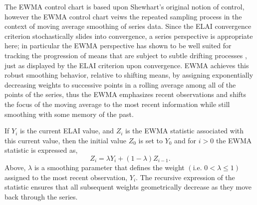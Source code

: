 \documentclass[12pt]{article}
\begin{document}
%
The EWMA control chart is based upon Shewhart's original notion of control, however the EWMA control chart veiws the repeated sampling process in the context of moving average smoothing of series data. %
Since the ELAI convergence criterion stochastically slides into convergence, a series perspective is appropriate here; in particular the EWMA perspective has shown to be well suited for tracking the progression of means that are subject to subtle drifting processes \cite{adaptEWMA, ?}, just as displayed by the ELAI criterion upon convergence.
%
EWMA achieves this robust smoothing behavior, relative to shifting means, by assigning exponentially decreasing weights to successive points in a rolling average among all of the points of the series, thus the EWMA emphasizes recent observations and shifts the focus of the moving average to the most recent information while still smoothing with some memory of the past.

%
%

If $Y_i$ is the current ELAI value, and $Z_i$ is the EWMA statistic associated with this current value, then the initial value $Z_0$ is set to $Y_0$ and for $i>0$ the EWMA statistic is expressed as,
%
\begin{equation}
Z_i=\lambda Y_i+(1-\lambda)Z_{i-1}.
\label{ewmaStat}
\end{equation}
%
Above, $\lambda$ is a smoothing parameter that defines the weight $\left( \text{i.e. }0<\lambda\le1\right)$ assigned to the most recent observation, $Y_i$.
The recursive expression of the statistic ensures that all subsequent weights geometrically decrease as they move back through the series.

%
%
\end{document}
